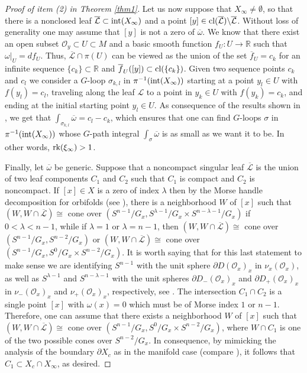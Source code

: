 \documentclass[
  a4paper, 
  reqno, 
  oneside, 
  12pt
]{amsart}
\theoremstyle{definition}
\theoremstyle{remark}
\begin{document}
\begin{proof}[Proof of item (2) in Theorem \ref{thm1}]
Let us now suppose that  $X_\infty\neq \emptyset$, so that there is a nonclosed leaf $\overline{\mathcal{L}}\subset \textnormal{int}(X_\infty)$ and a point $[y]\in \textnormal{cl}(\overline{\mathcal{L}})\backslash \overline{\mathcal{L}}$. Without loss of generality one may assume that $[y]$ is not a zero of $\overline{\omega}$. We know that there exist an open subset $\mathcal{O}_y\subset U\subset M$ and a basic smooth function $f_U:U\to \mathbb{R}$ such that $\omega|_U=df_U$. Thus, $\overline{\mathcal{L}}\cap \pi(U)$ can be viewed as the union of the set $\overline{f}_U=c_k$ for an infinite sequence $\lbrace c_k\rbrace\subset \mathbb{R}$ and $\overline{f}_U([y])\subset \textnormal{cl}(\lbrace c_k\rbrace)$. Given two sequence points $c_k$ and $c_l$ we consider a $G$-loop $\sigma_{k,l}$ in $\pi^{-1}(\textnormal{int}(X_\infty))$ starting at a point $y_l\in U$ with $f(y_l)=c_l$, traveling along the leaf $\mathcal{L}$ to a point in $y_k\in U$ with $f(y_k)=c_k$, and ending at the initial starting point $y_l\in U$. As consequence of the results shown in \cite[s. 3.1]{V}, we get that $\int_{\sigma_{k,l}}\overline{\omega}=c_l-c_k$, which ensures that one can find $G$-loops $\sigma$ in $\pi^{-1}(\textnormal{int}(X_\infty))$ whose $G$-path integral $\int_\sigma\overline{\omega}$ is as small as we want it to be. In other words, $\textnormal{rk}(\xi_\infty)>1$.

Finally, let $\overline{\omega}$ be generic. Suppose that a noncompact singular leaf 
$\overline{\mathcal{L}}$ is the union of two leaf components $C_1$ and $C_2$ such that $C_1$ is compact and $C_2$ is noncompact. If $[x]\in X$ is a zero of index $\lambda$ then by the Morse handle decomposition for orbifolds (see \cite{Hep,OV}), there is a neighborhood $W$ of $[x]$ such that $(W,W\cap \overline{\mathcal{L}})\cong$ cone over $(S^{n-1}/G_x,S^{\lambda-1}/G_x\times S^{n-\lambda-1}/G_x)$ if $0<\lambda<n-1$, while if $\lambda=1$ or $\lambda=n-1$, then $(W,W\cap \overline{\mathcal{L}})\cong$ cone over $(S^{n-1}/G_x, S^{n-2}/G_x)$ or $(W,W\cap \overline{\mathcal{L}})\cong$ cone over $(S^{n-1}/G_x, S^0/G_x\times S^{n-2}/G_x)$. It is worth saying that for this last statement to make sense we are identifying $S^{n-1}$ with the unit sphere $\partial D(\mathcal{O}_x)_x$ in $\nu_x(\mathcal{O}_x)$, as well as $S^{\lambda-1}$ and $S^{n-\lambda-1}$ with the unit spheres $\partial D_-(\mathcal{O}_x)_x$ and $\partial D_+(\mathcal{O}_x)_x$ in $\nu_-(\mathcal{O}_x)_x$ and $\nu_+(\mathcal{O}_x)_x$, respectively, see \cite[Prop. 5.8]{OV}. The intersection $C_1\cap C_2$ is a single point $[x]$ with $\omega(x)=0$ which must be of Morse index $1$ or $n-1$. Therefore, one can assume that there exists a neighborhood $W$ of $[x]$ such that $(W,W\cap \overline{\mathcal{L}})\cong$ cone over $(S^{n-1}/G_x, S^0/G_x\times S^{n-2}/G_x)$, where $W\cap C_1$ is one of the two possible cones over $ S^{n-2}/G_x$. In consequence, by mimicking the analysis of the boundary $\partial X_c$ as in the manifold case (compare \cite[p. 129]{F}), it follows that $C_1\subset X_c\cap X_\infty$, as desired.
\end{proof}
\end{document}

